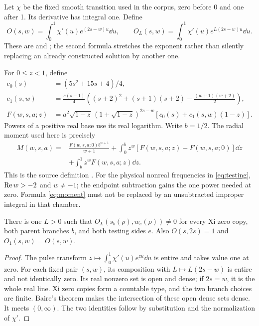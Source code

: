 Let \(\chi\) be the fixed smooth transition used in the corpus, zero before 0 and one after 1. Its derivative has integral one. Define
\[
 O(s,w)=\int_0^1\chi'(u)e^{(2s-w)u}\dd u,\qquad
 O_L(s,w)=\int_0^1\chi'(u)e^{L(2s-w)u}\dd u.
\]
These are  and ; the second formula stretches the exponent rather than silently replacing an already constructed solution by another one.

For \(0\le z<1\), define
\begin{align*}
 c_0(s)&=(5s^2+15s+4)/4,\\
 c_1(s,w)&=\frac{s(s-1)}4\left((s+2)^2+(s+1)(s+2)
                                  -\frac{(w+1)(w+2)}2\right),\\
 F(w,s,a;z)&=a^2\sqrt{1-z}\,(1+\sqrt{1-z})^{2s-w}
                      [c_0(s)+c_1(s,w)(1-z)].
\end{align*}
Powers of a positive real base use its real logarithm. Write \(b=1/2\). The radial moment used here is precisely
\begin{align}\label{eq:moment}
 M(w,s,a)={}&\frac{F(w,s,a;0)b^{w+1}}{w+1}
 +\int_0^b z^w[F(w,s,a;z)-F(w,s,a;0)]\dd z\nonumber\\
 &+\int_b^1z^wF(w,s,a;z)\dd z.
\end{align}
This is the source definition . For the physical nonreal frequencies in \eqref{eq:testing}, \(\operatorname{Re} w>-2\) and \(w\ne-1\); the endpoint subtraction gains the one power needed at zero. Formula \eqref{eq:moment} must not be replaced by an unsubtracted improper integral in that chamber.

\begin{theorem}\label{thm:onset}
There is one \(L>0\) such that \(O_L(s_b(\rho),w_e(\rho))\ne0\) for every Xi zero copy, both parent branches \(b\), and both testing sides \(e\). Also \(O(s,2s)=1\) and \(O_1(s,w)=O(s,w)\).
\end{theorem}
\begin{proof}
The pulse transform \(z\mapsto\int_0^1\chi'(u)e^{zu}\dd u\) is entire and takes value one at zero. For each fixed pair \((s,w)\), its composition with \(L\mapsto L(2s-w)\) is entire and not identically zero. Its real nonzero set is open and dense; if \(2s=w\), it is the whole real line. Xi zero copies form a countable type, and the two branch choices are finite. Baire's theorem makes the intersection of these open dense sets dense. It meets \((0,\infty)\). The two identities follow by substitution and the normalization of \(\chi'\).
\end{proof}

